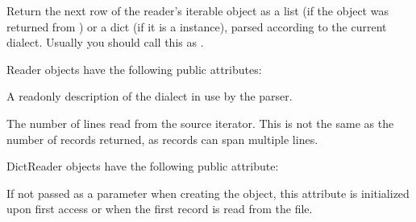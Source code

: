 \documentclass[letterpaper,10pt,english]{sphinxmanual}
\begin{document}
\begin{fulllineitems}
\label{\detokenize{csv:csv.csvreader.__next__}}
Return the next row of the reader’s iterable object as a list (if the object
was returned from {\hyperref[\detokenize{csv:csv.reader}]{}}) or a dict (if it is a {\hyperref[\detokenize{csv:csv.DictReader}]{}}
instance), parsed according to the current dialect.  Usually you should call
this as .

\end{fulllineitems}


Reader objects have the following public attributes:

\begin{fulllineitems}
\label{\detokenize{csv:csv.csvreader.dialect}}
A read\sphinxhyphen{}only description of the dialect in use by the parser.

\end{fulllineitems}


\begin{fulllineitems}
\label{\detokenize{csv:csv.csvreader.line_num}}
The number of lines read from the source iterator. This is not the same as the
number of records returned, as records can span multiple lines.

\end{fulllineitems}


DictReader objects have the following public attribute:

\begin{fulllineitems}
\label{\detokenize{csv:csv.csvreader.fieldnames}}
If not passed as a parameter when creating the object, this attribute is
initialized upon first access or when the first record is read from the
file.

\end{fulllineitems}
\end{document}
